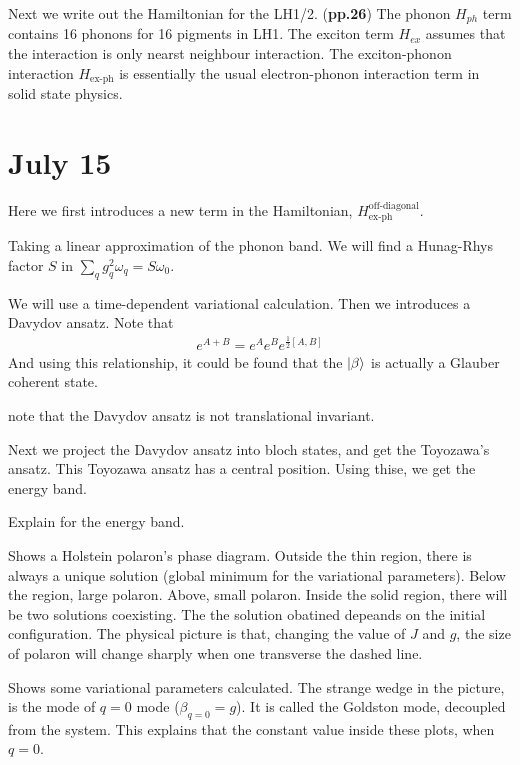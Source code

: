 \documentclass{article}
\numberwithin{equation}{subsection} %
\theoremstyle{definition}
\begin{document}
Next we write out the Hamiltonian for the LH1/2. (\textbf{pp.26})
The phonon $H_{ph}$ term 
contains 16 phonons for 16 pigments in LH1. The exciton term $H_{ex}$
assumes that the interaction is only nearst neighbour interaction.
The exciton-phonon interaction $H_{\text{ex-ph}}$ is essentially
the usual electron-phonon interaction term in solid state physics.
\section{July 15}
\label{sec:July_15}

Here we first introduces a new term in the Hamiltonian, 
$H_{\text{ex-ph}}^{\text{off-diagonal}}$.

Taking a linear approximation of the phonon band. We will find
a Hunag-Rhys factor $S$ in $\sum_q g_q^2 \omega_q = S\omega_0$.

We will use a time-dependent variational calculation. Then
we introduces a Davydov ansatz. Note that
\begin{align*}
    e^{A+B} = e^A e^B e^{\frac{1}{2}[A,B]}
\end{align*}
And using this relationship, it could be found that the $\ket{\beta}$
is actually a Glauber coherent state.

note that the Davydov ansatz is not translational invariant. 

Next we project the Davydov ansatz into bloch states, and get
the Toyozawa's ansatz. This Toyozawa ansatz has a central
position. Using thise, we get the energy band.

Explain for the energy band.

Shows a Holstein polaron's phase diagram. Outside the thin region,
there is always a unique solution (global minimum for the variational
parameters). Below the region, large polaron. Above, small polaron.
Inside the solid region, there will be two solutions coexisting.
The the solution obatined depeands on the initial configuration.
The physical picture is that, changing the value of $J$ and $g$,
the size of polaron will change sharply when one transverse the
dashed line.

Shows some variational parameters calculated. The strange wedge
in the picture, is the mode of $q=0$ mode ($\beta_{q=0} = g$). It is
called the Goldston mode, decoupled from the system. This explains
that the constant value inside these plots, when $q=0$.
\end{document}
